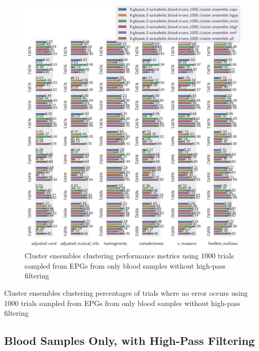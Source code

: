 \begin{theappendices}
\begin{figure}[H]
\centering
\includegraphics[width=\textwidth]{./figures/clust_comparison/highpass_0-sampleids_blood-nruns_1000_cluster_ensembles.pdf}
\caption{Cluster ensembles clustering performance metrics using 1000 trials sampled from EPGs from only blood samples without high-pass filtering}
\label{fig:highpass_0-sampleids_blood-nruns_1000_cluster_ensembles}
\end{figure}

\begin{table}[H]
\centering
{}
\caption{Cluster ensembles clustering percentages of trials where no error occurs using 1000 trials sampled from EPGs from only blood samples without high-pass filtering}
\label{table:highpass_0-sampleids_blood-nruns_1000_cluster_ensembles}
\end{table}

\subsection{Blood Samples Only, with High-Pass Filtering}


\end{theappendices}
